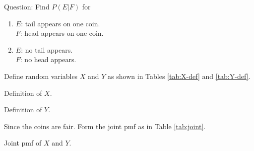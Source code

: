 \documentclass[journal,11pt,twocolumn]{IEEEtran}
\begin{document}
Question: Find $P(E|F)$ for
\begin{enumerate}
\item$E$: tail appears on one coin.\\
   $F$: head appears on one coin.
\item$E$: no tail appears.\\
    $F$: no head appears.
\end{enumerate}
\solution 
Define random variables $X$ and $Y$ as shown in Tables \ref{tab:X-def} and \ref{tab:Y-def}.
\begin{table}[!ht]
\centering

\caption{Definition of $X$.}
\label{tab:X-def}
\end{table}
\begin{table}[!ht]
\centering

\caption{Definition of $Y$.}
\label{tab:Y-def}
    \end{table}
    Since the coins are fair.
    Form the joint pmf as in Table \ref{tab:joint}.
    \begin{table}[!ht]
        \centering
        
        \caption{Joint pmf of $X$ and $Y$.}
        \label{tab:joint}
    \end{table}
\end{document}
